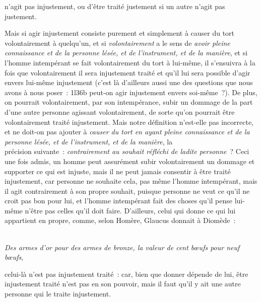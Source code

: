 \documentclass[french,twoside]{book} %
\begin{document}
n’agit pas injustement, ou d’être traité justement si un autre n’agit pas justement.\par
Mais si agir injustement consiste purement et simplement à causer du tort volontairement à quelqu’un, et si {\itshape volontairement} a le sens de {\itshape avoir pleine connaissance et de la personne lésée, et de l’instrument, et de la manière}, et si l’homme intempérant se fait volontairement du tort à lui-même, il s’ensuivra à la fois que volontairement il sera injustement traité et qu’il lui sera possible d’agir envers lui-même injustement (c’est là d’ailleurs aussi une des questions que nous avons à nous poser : 1l36b peut-on agir injustement envers soi-même ?). De plus, on pourrait volontairement, par son intempérance, subir un dommage de la part d’une autre personne agissant volontairement, de sorte qu’on pourrait être volontairement traité injustement. Mais notre définition n’est-elle pas incorrecte, et ne doit-on pas ajouter à {\itshape causer du tort en ayant pleine connaissance et de la personne lésée, et de l’instrument, et de la manière}, la \\
précision suivante : {\itshape contrairement au souhait réfléchi de ladite personne} ? Ceci une fois admis, un homme peut assurément subir volontairement un dommage et supporter ce qui est injuste, mais il ne peut jamais consentir à être traité injustement, car personne ne souhaite cela, pas même l’homme intempérant, mais il agit contrairement à son propre souhait, puisque personne ne veut ce qu’il ne croit pas bon pour lui, et l’homme intempérant fait des choses qu’il pense lui-même n’être pas celles qu’il doit faire. D’ailleurs, celui qui donne ce qui lui appartient en propre, comme, selon Homère, Glaucus donnait à Diomède :\par
\\
{\itshape Des armes d’or pour des armes de bronze, la valeur de cent bœufs pour neuf bœufs}, \par
celui-là n’est pas injustement traité : car, bien que donner dépende de lui, être injustement traité n’est pas en son pouvoir, mais il faut qu’il y ait une autre personne qui le traite injustement.
\end{document}
